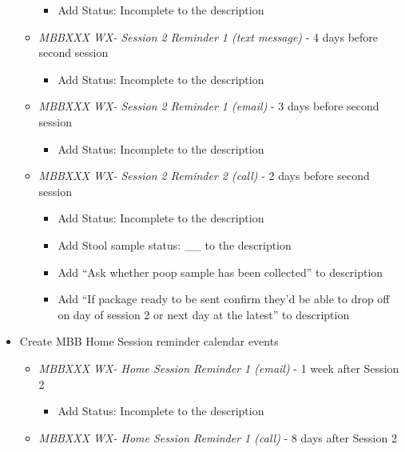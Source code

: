 \documentclass[]{book}
\providecommand{\tightlist}{%
  \setlength{\itemsep}{0pt}\setlength{\parskip}{0pt}}
\begin{document}
\begin{itemize}
\begin{itemize}
    \begin{itemize}
    \tightlist
    \item
      Add Status: Incomplete to the description
    \end{itemize}
  \item
    \emph{MBBXXX WX- Session 2 Reminder 1 (text message) } - 4 days before second session

    \begin{itemize}
    \tightlist
    \item
      Add Status: Incomplete to the description
    \end{itemize}
  \item
    \emph{MBBXXX WX- Session 2 Reminder 1 (email) } - 3 days before second session

    \begin{itemize}
    \tightlist
    \item
      Add Status: Incomplete to the description
    \end{itemize}
  \item
    \emph{MBBXXX WX- Session 2 Reminder 2 (call)} - 2 days before second session

    \begin{itemize}
    \tightlist
    \item
      Add Status: Incomplete to the description
    \item
      Add Stool sample status: \_\_ to the description
    \item
      Add ``Ask whether poop sample has been collected'' to description\\
    \item
      Add ``If package ready to be sent confirm they'd be able to drop off on day of session 2 or next day at the latest'' to description
    \end{itemize}
  \end{itemize}
\item
  Create MBB Home Session reminder calendar events

  \begin{itemize}
  \tightlist
  \item
    \emph{MBBXXX WX- Home Session Reminder 1 (email)} - 1 week after Session 2

    \begin{itemize}
    \tightlist
    \item
      Add Status: Incomplete to the description
    \end{itemize}
  \item
    \emph{MBBXXX WX- Home Session Reminder 1 (call)} - 8 days after Session 2


\end{itemize}
\end{itemize}
\end{document}
